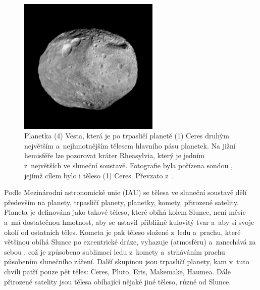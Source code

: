 \documentclass[A4paper, 12pt, oneside]{book}
\begin{document}
\begin{figure}[!htb]
	\centering
	\includegraphics[width=0.6\textwidth]{obr/vesta.jpg}
	\caption{Planetka (4) Vesta, která je po trpasličí planetě (1) Ceres druhým největším a~nejhmotnějším tělesem hlavního pásu planetek. Na jižní hemisféře lze pozorovat kráter Rheasylvia, který je jedním z~největších ve sluneční soustavě. Fotografie byla pořízena sondou , jejímž cílem bylo i těleso (1) Ceres. Převzato z~\cite{jplvesta}.} \label{fig:vesta}
\end{figure}

Podle Mezinárodní astronomické unie (IAU) se tělesa ve sluneční soustavě dělí především na planety, trpasličí planety, planetky, komety, přirozené satelity. Planeta je definována jako takové těleso, které obíhá kolem Slunce, není měsíc a~má dostatečnou hmotnost, aby se ustavil přibližně kulovitý tvar a~aby si  svoje okolí od ostatních těles. Kometa je pak těleso složené z~ledu a~prachu, které většinou obíhá Slunce po excentrické dráze, vyhazuje  (atmosféru) a~zanechává za sebou , což je způsobeno sublimací ledu z~komety a~strháváním prachu působením slunečního záření. Další skupinou jsou trpasličí planety, kam v~tuto chvíli patří pouze pět těles: Ceres, Pluto, Eris, Makemake, Haumea. Dále přirozené satelity jsou tělesa obíhající nějaké jiné těleso, různé od Slunce.
\end{document}
